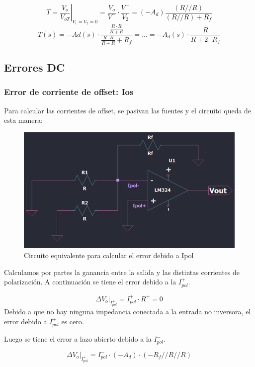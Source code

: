 \[T = \left.\frac{V_{o}}{V_{oT}}\right|_{V_{1}=V_{2}=0} = \frac{V_{o}}{V^{-}} \cdot \frac{V^{-}}{V_{2}} = (-A_d) \frac{(R // R)}{(R // R)+R_f} \]
\[
 T (s) = -Ad(s) \cdot \frac{\frac{R \cdot R}{R+R}}{\frac{R \cdot R}{R+R} + R_f} = ... 
 = -A_d (s) \cdot  \frac{R}{R + 2\cdot R_f}\] 

\subsection{Errores DC}

\subsubsection{Error de corriente de offset: Ios}
Para calcular las corrientes de offset, se pasivan las fuentes y el circuito queda de esta manera:

\begin{figure}[h!]
    \centering
    \includegraphics[width=0.90\linewidth]{img/equivalente_ios.png}
    \caption{Circuito equivalente para calcular el error debido a Ipol}
    \label{fig:equivalente_ios}
\end{figure}

\vspace{1em}
Calculamos por partes la ganancia entre la salida y las distintas corrientes de polarización. A continuación se tiene el error debido a la $I_{pol}^{+}$.

\[
\left.\Delta V_{o} \right|_{I_{p o l}^{+}}= I_{p o l}^{+} \cdot R^{+} = 0
\]
Debido a que no hay ninguna impedancia conectada a la entrada no inversora, el error debido a  $I_{pol}^{+}$ es cero.

\vspace{1em}

Luego se tiene el error a lazo abierto debido a la $I_{pol}^{-}$.
 
\[
\left.\Delta V_{o} \right|_{I_{pol}^{+}} = I_{pol}^{-} \cdot (-A_d) \cdot (-R_f // R // R)
\] 

